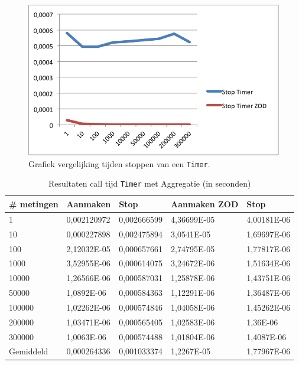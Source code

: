 \begin{figure}[!h]
  \centering
  \includegraphics[scale=1.0]{Afbeeldingen/Evaluatie/StopTimer}
  \caption{Grafiek vergelijking tijden stoppen van een \texttt{Timer}.}
  \label{fig:GraphTimerStop}
\end{figure}


\begin{table}[]
\centering
\begin{tabular}{|l|l|l|l|l|}
\hline
\# metingen & Aanmaken    & Stop        & Aanmaken ZOD & Stop        \\ \hline
1           & 0,002120972 & 0,002666599 & 4,36699E-05  & 4,00181E-06 \\ \hline
10          & 0,000227898 & 0,002475894 & 3,0541E-05   & 1,69697E-06 \\ \hline
100         & 2,12032E-05 & 0,000657661 & 2,74795E-05  & 1,77817E-06 \\ \hline
1000        & 3,52955E-06 & 0,000614075 & 3,24672E-06  & 1,51634E-06 \\ \hline
10000       & 1,26566E-06 & 0,000587031 & 1,25878E-06  & 1,43751E-06 \\ \hline
50000       & 1,0892E-06  & 0,000584363 & 1,12291E-06  & 1,36487E-06 \\ \hline
100000      & 1,02262E-06 & 0,000574846 & 1,04058E-06  & 1,45262E-06 \\ \hline
200000      & 1,03471E-06 & 0,000565405 & 1,02583E-06  & 1,36E-06    \\ \hline
300000      & 1,0063E-06  & 0,000574488 & 1,01804E-06  & 1,4087E-06  \\ \hline
Gemiddeld   & 0,000264336 & 0,001033374 & 1,2267E-05   & 1,77967E-06 \\ \hline
\end{tabular}
\caption{Resultaten call tijd \texttt{Timer} met Aggregatie (in seconden)}
\label{Table:TimerAggregate}
\end{table}

